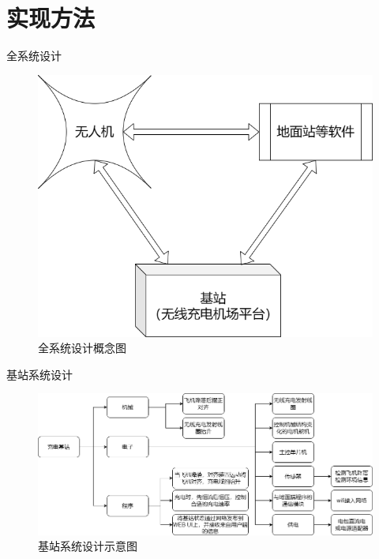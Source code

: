 

\section{实现方法}

\begin{frame}[fragile]{全系统设计}
  \begin{figure}[H]
    \centering
    \includegraphics[height=0.7\textheight]{figures/full_system.png}
    \caption{全系统设计概念图}
  \end{figure}
\end{frame}

\begin{frame}[fragile]{基站系统设计}
  \begin{figure}[H]
    \centering
    \includegraphics[height=0.7\textheight]{figures/base_station.png}
    \caption{基站系统设计示意图}
  \end{figure}
\end{frame}

